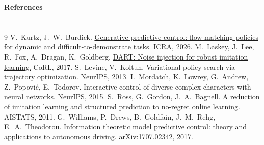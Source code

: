 \documentclass[12pt]{article}
\begin{document}
\textbf{References}
{\footnotesize
\setlength{\bibsep}{0pt}
\makeatletter\renewcommand\section{\@gobbletwo}\makeatother
\begin{thebibliography}{9}
 V.~Kurtz, J.~W.~Burdick.
\href{https://arxiv.org/abs/2502.13406}{Generative predictive control: flow matching
policies for dynamic and difficult-to-demonstrate tasks.} ICRA, 2026.
 M.~Laskey, J.~Lee, R.~Fox, A.~Dragan,
K.~Goldberg. \href{https://arxiv.org/abs/1703.09327}{DART: Noise injection for robust
imitation learning.} CoRL, 2017.
 S.~Levine, V.~Koltun. Variational policy
search via trajectory optimization. NeurIPS, 2013.
 I.~Mordatch, K.~Lowrey, G.~Andrew,
Z.~Popovi\'c, E.~Todorov. Interactive control of diverse complex characters with
neural networks. NeurIPS, 2015.
 S.~Ross, G.~Gordon, J.~A.~Bagnell.
\href{https://proceedings.mlr.press/v15/ross11a.html}{A reduction of imitation
learning and structured prediction to no-regret online learning.} AISTATS, 2011.
 G.~Williams, P.~Drews, B.~Goldfain,
J.~M.~Rehg, E.~A.~Theodorou. \href{https://arxiv.org/abs/1707.02342}{Information
theoretic model predictive control: theory and applications to autonomous driving.}
arXiv:1707.02342, 2017.
\end{thebibliography}}
\end{document}
